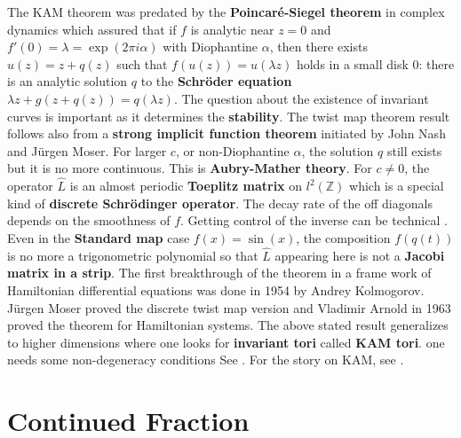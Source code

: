 \documentclass[12pt]{amsart}
\begin{document}
The KAM theorem was predated by the {\bf Poincar\'e-Siegel theorem} in complex dynamics
which assured that if $f$ is analytic near $z=0$ and $f'(0)=\lambda = \exp(2 \pi i \alpha)$
with Diophantine $\alpha$, then there exists $u(z) = z+q(z)$ such that
$f(u(z)) = u(\lambda z)$ holds in a small disk $0$: there is an analytic solution
$q$ to the {\bf Schr\"oder equation} $\lambda z + g(z+q(z)) = q(\lambda z)$. 
The question about the existence of invariant curves is important as it determines
the {\bf stability}. The twist map theorem result follows also from a {\bf strong implicit function theorem}
initiated by John Nash and J\"urgen Moser. 
For larger $c$, or non-Diophantine $\alpha$, the solution $q$ still exists but
it is no more continuous. This is {\bf Aubry-Mather theory}.
For $c \neq 0$, the operator $\hat{L}$ is an almost periodic 
{\bf Toeplitz matrix} on $l^2(\mathbb{Z})$ which is a special kind of 
{\bf discrete Schr\"odinger operator}. The decay rate of the off diagonals depends on the
smoothness of $f$. Getting control of the inverse can be technical \cite{Bourgain2005}.
Even in the {\bf Standard map} case $f(x)=\sin(x)$, the composition $f(q(t))$
is no more a trigonometric polynomial so that $\hat{L}$ appearing here is not a {\bf Jacobi matrix
in a strip}. The first breakthrough of the theorem in a frame work of Hamiltonian differential
equations was done in 1954 by Andrey Kolmogorov. J\"urgen Moser proved the discrete twist map version and
Vladimir Arnold in 1963 proved the theorem for Hamiltonian systems. The above stated result generalizes 
to higher dimensions where one looks for {\bf invariant tori} called {\bf KAM tori}. 
one needs some non-degeneracy conditions
See \cite{Carlson,MoserStableRandom,MoserVariations}. For the story on KAM, see \cite{Dumas2014}.

\section{Continued Fraction}
\end{document}
